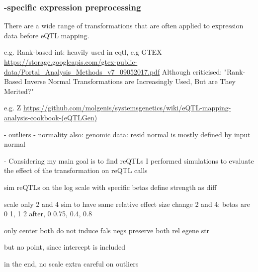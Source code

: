 \subsubsection{-specific expression preprocessing}

There are a wide range of transformations that are often applied to expression data before \gls{eQTL} mapping.

e.g. Rank-based int:
heavily used in eqtl, e.g GTEX \url{https://storage.googleapis.com/gtex-public-data/Portal_Analysis_Methods_v7_09052017.pdf}
    Although criticised: "Rank-Based Inverse Normal Transformations are Increasingly Used, But are They Merited?"

e.g. Z
\url{https://github.com/molgenis/systemsgenetics/wiki/eQTL-mapping-analysis-cookbook-(eQTLGen)}

- outliers
- normality also: genomic data: resid normal is mostly defined by input normal

- Considering my main goal is to find reQTLs
I performed simulations to evaluate the effect of the transformation on reQTL calls

sim reQTLs on the log scale with specific betas
define strength as diff

scale only
2 and 4 sim to have same relative effect size change
2 and 4: betas are 0 1, 1 2
after, 0 0.75, 0.4, 0.8

only center
both
do not induce fals negs
preserve both rel egene str

but no point, since intercept is included

in the end, no scale
extra careful on outliers

